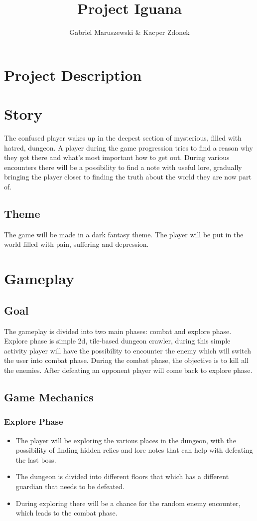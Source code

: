 \documentclass[a4paper,11pt]{article}
\title{Project Iguana}
\author{Gabriel Maruszewski \& Kacper Zdonek}
\date
\begin{document}
\maketitle
\newpage
\tableofcontents
\newpage
\section{Project Description}
\section{Story}
The confused player wakes up in the deepest section of mysterious, filled with hatred, dungeon. A player during the game progression tries to find a reason why they got there and what’s most important how to get out. During various encounters there will be a possibility to find a note with useful lore, gradually bringing the player closer to finding the truth about the world they are now part of.
\subsection{Theme}
The game will be made in a dark fantasy theme. The player will be put in the world filled with pain, suffering and depression.
\section{Gameplay}
\subsection{Goal}
The gameplay is divided into two main phases: combat and explore phase. Explore phase is simple 2d, tile-based dungeon crawler, during this simple activity player will have the possibility to encounter the enemy which will switch the user into combat phase. During the combat phase, the objective is to kill all the enemies. After defeating an opponent player will come back to explore phase.
\subsection{Game Mechanics}
\subsubsection{Explore Phase}
\begin{itemize}
\item The player will be exploring the various places in the dungeon, with the possibility of finding hidden relics and lore notes that can help with defeating the last boss.
\item The dungeon is divided into different floors that which has a different guardian that needs to be defeated.
\item During exploring there will be a chance for the random enemy encounter, which leads to the combat phase.
\end{itemize}
\newpage
\end{document}
